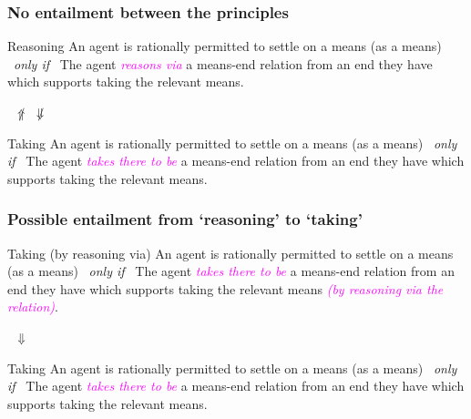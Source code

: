 \documentclass[noamssymb, compress, handout]{beamer} %
\begin{document}
\begin{frame}
  \frametitle{No entailment between the principles}

  \begin{block}{Reasoning}
    An agent is rationally permitted to settle on a means (as a means)
    \newline
    \mbox{ }\hfill\emph{only if}\hfill\mbox{ }
    \newline
    The agent \textcolor{fuchsia}{\emph{reasons via}}  a means-end relation from an end they have which supports taking the relevant means.
  \end{block}

  {\Large \mbox{ }\hfill \(\not\Uparrow\) \qquad \(\not\Downarrow\) \hfill\mbox{ }}

  \begin{block}{Taking}
    An agent is rationally permitted to settle on a means (as a means)
    \newline
    \mbox{ }\hfill\emph{only if}\hfill\mbox{ }
    \newline
    The agent \textcolor{fuchsia}{\emph{takes there to be}} a means-end relation from an end they have which supports taking the relevant means.
  \end{block}

\end{frame}


\begin{frame}
  \frametitle{Possible entailment from `reasoning' to `taking'}

  \begin{block}{Taking (by reasoning via)}
    An agent is rationally permitted to settle on a means (as a means)
    \newline
    \mbox{ }\hfill\emph{only if}\hfill\mbox{ }
    \newline
    The agent \textcolor{fuchsia}{\emph{takes there to be}}  a means-end relation from an end they have which supports taking the relevant means \textcolor{fuchsia}{\emph{(by reasoning via the relation)}}.
  \end{block}

  {\Large \mbox{ }\hfill\(\Downarrow\)\hfill\mbox{ }}

  \begin{block}{Taking}
    An agent is rationally permitted to settle on a means (as a means)
    \newline
    \mbox{ }\hfill\emph{only if}\hfill\mbox{ }
    \newline
    The agent \textcolor{fuchsia}{\emph{takes there to be}} a means-end relation from an end they have which supports taking the relevant means.
  \end{block}

\end{frame}
\end{document}
